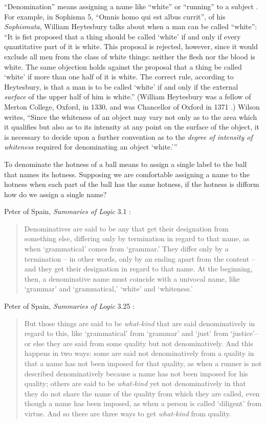 \documentclass{article}
\begin{document}
``Denomination'' means assigning a name like ``white'' or ``running'' to a subject  \cite[p.~21]{wilson}. For example, 
in Sophisma 5, ``Omnis homo qui est albus currit'', of his {\em Sophismata}, William Heytesbury talks about when a man can be called ``white'':
``It is fist proposed that a thing should be called `white' if and only if every quantitative part of it is white. This proposal is rejected, however, since it would exclude all men from the class of white things: neither the flesh nor the blood is white. The same objection holds against the proposal that a thing be called `white' if more than one half of it is white. The correct rule, according to Heytesbury, is that a man is to be called `white' if and only if the external {\em surface} of the upper half of him is white.''  \cite[p.~22]{wilson}
(William Heytesbury was a fellow of Merton College, Oxford, in 1330, and was Chancellor of Oxford in 1371 \cite[p.~7]{wilson}.)
Wilson \cite[p.~23]{wilson} writes, ``Since the whiteness of an object may vary not only as to the area which it qualifies but also as to its intensity at any point on the surface
of the object, it is necessary to decide upon a further convention as to the {\em degree of intensity of whiteness} required for denominating an object {`white.'}''

To denominate the hotness of a ball means to assign a single label to the ball that names its hotness.
Supposing we are comfortable assigning a name to the hotness when each part of the ball has the same
hotness, if the hotness is difform how do we assign a single name? 

Peter of Spain, {\em Summaries of Logic} 3.1 \cite[p.~147]{copenhaver}:

\begin{quote}
Denominatives are said to be any that get their
designation from something else, differing only by termination in regard to that name,
as when `grammatical' comes from `grammar.' They differ only by a termination -- in
other words, only by an ending apart from the content -- and they get their designation
in regard to that name. At the beginning, then, a denominative name must coincide
with a univocal name, like `grammar' and `grammatical,' `white' and `whiteness.'
\end{quote}

Peter of Spain, {\em Summaries of Logic} 3.25 \cite[p.~163]{copenhaver}:

\begin{quote}
But those things are said to be {\em what-kind} that are said denominatively in regard to
this, like `grammatical' from `grammar' and `just' from `justice'--or else they are said
from some quality but not denominatively. And this happens in two ways: some are
said not denominatively from a quality in that a name has not been imposed for that
quality, as when a runner is not described denominatively because a name has not been
imposed for his quality; others are said to be {\em what-kind} yet not denominatively in that
they do not share the name of the quality from which they are called, even though a
name has been imposed, as when a person is called `diligent' from virtue. And so there
are three ways to get {\em what-kind} from quality.
\end{quote}
\end{document}

